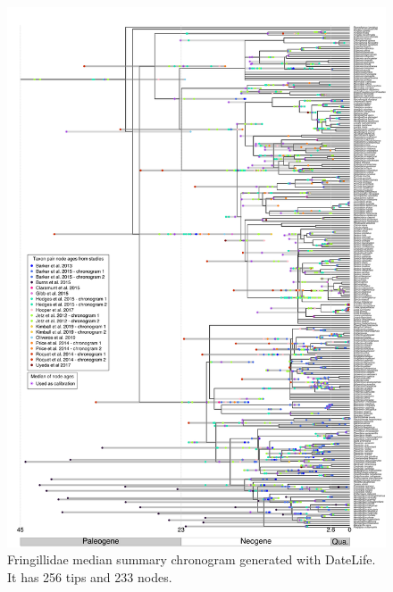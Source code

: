 \begin{figure}[!h]
\includegraphics{../figures/figure-fringillidae/median_and_calibration_ages_simple.png}
\caption{Fringillidae median summary chronogram generated with DateLife. It has 256 tips and 233 nodes.}
\label{fig:fringillidages}
\end{figure}
